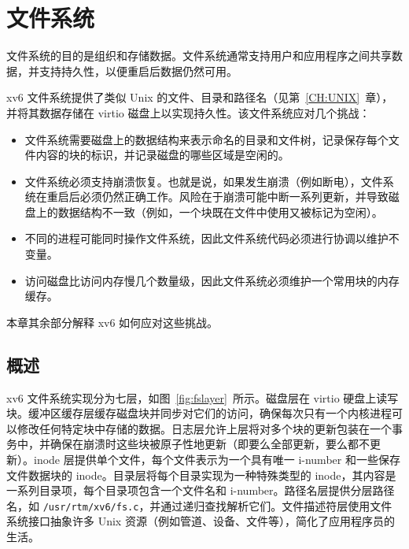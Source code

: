 \chapter{文件系统}
\label{CH:FS}
% 
% 
% 
% 

文件系统的目的是组织和存储数据。文件系统通常支持用户和应用程序之间共享数据，并支持持久性，以便重启后数据仍然可用。

xv6 文件系统提供了类似 Unix 的文件、目录和路径名（见第~\ref{CH:UNIX}~章），并将其数据存储在 virtio 磁盘上以实现持久性。该文件系统应对几个挑战：
\begin{itemize}
  
\item 文件系统需要磁盘上的数据结构来表示命名的目录和文件树，记录保存每个文件内容的块的标识，并记录磁盘的哪些区域是空闲的。
\item 文件系统必须支持崩溃恢复。也就是说，如果发生崩溃（例如断电），文件系统在重启后必须仍然正确工作。风险在于崩溃可能中断一系列更新，并导致磁盘上的数据结构不一致（例如，一个块既在文件中使用又被标记为空闲）。
\item 不同的进程可能同时操作文件系统，因此文件系统代码必须进行协调以维护不变量。
\item 访问磁盘比访问内存慢几个数量级，因此文件系统必须维护一个常用块的内存缓存。

\end{itemize}

本章其余部分解释 xv6 如何应对这些挑战。
\section{概述}

xv6 文件系统实现分为七层，如图~\ref{fig:fslayer}~所示。磁盘层在 virtio 硬盘上读写块。缓冲区缓存层缓存磁盘块并同步对它们的访问，确保每次只有一个内核进程可以修改任何特定块中存储的数据。日志层允许上层将对多个块的更新包装在一个事务中，并确保在崩溃时这些块被原子性地更新（即要么全部更新，要么都不更新）。inode 层提供单个文件，每个文件表示为一个具有唯一 i-number 和一些保存文件数据块的 inode。目录层将每个目录实现为一种特殊类型的 inode，其内容是一系列目录项，每个目录项包含一个文件名和 i-number。路径名层提供分层路径名，如 \lstinline{/usr/rtm/xv6/fs.c}，并通过递归查找解析它们。文件描述符层使用文件系统接口抽象许多 Unix 资源（例如管道、设备、文件等），简化了应用程序员的生活。

